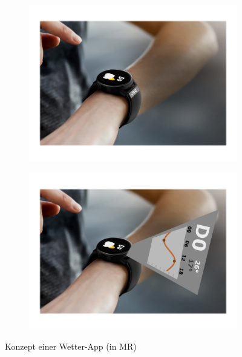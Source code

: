 \documentclass[11pt, a4paper]{article}
\begin{document}
\begin{figure}[h]
	\begin{subfigure}[c]{0.35\textwidth}
        \centering
		\includegraphics[scale=.32]{assets/Weather_1.png}
	\end{subfigure}
	\begin{subfigure}[c]{0.4\textwidth}
        \centering
		\includegraphics[scale=.32]{assets/Weather_2.png}
	\end{subfigure}
    \centering
	\caption{Konzept einer Wetter-App (in MR)}
    \label{fig:concept_of_a_weatherApp}
\end{figure}

\newpage
\end{document}
